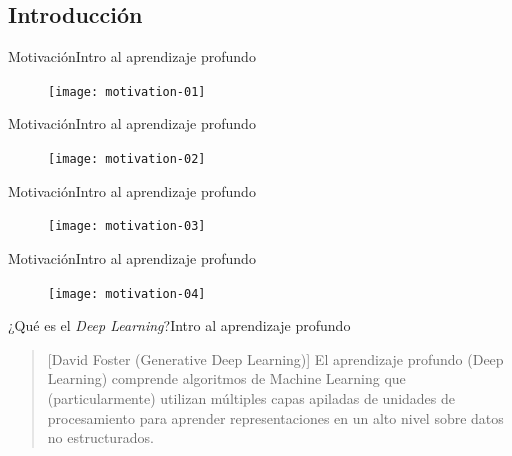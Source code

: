 \documentclass[10pt,border=3pt,tikz]{beamer}
\begin{document}
    \begin{frame}
        \sectionpage
    \end{frame}
    
    \subsection{Introducción}
    
    \begin{frame}{Motivación}{Intro al aprendizaje profundo}
        \begin{figure}
            \centering
            \texttt{[image: motivation-01]}
        \end{figure}
    \end{frame}
    
    \begin{frame}{Motivación}{Intro al aprendizaje profundo}
        \begin{figure}
            \centering
            \texttt{[image: motivation-02]}
        \end{figure}
    \end{frame}
    
    \begin{frame}{Motivación}{Intro al aprendizaje profundo}
        \begin{figure}
            \centering
            \texttt{[image: motivation-03]}
        \end{figure}
    \end{frame}

    \begin{frame}{Motivación}{Intro al aprendizaje profundo}
        \begin{figure}
            \centering
            \texttt{[image: motivation-04]}
        \end{figure}
    \end{frame}
    
    \begin{frame}{¿Qué es el \textsl{Deep Learning}?}{Intro al aprendizaje profundo}
        \begin{quotation}[David Foster (Generative Deep Learning)]
            El aprendizaje profundo (Deep Learning) comprende algoritmos de Machine Learning que (particularmente) utilizan múltiples capas apiladas de unidades de procesamiento para aprender representaciones en un alto nivel sobre datos no estructurados.
        \end{quotation}
    \end{frame}
    
\end{document}
